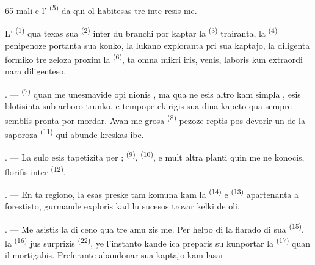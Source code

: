 \begin{VUpage}[67]{65}
\VUcontinue
mali e l' \textsuperscript{(5)} da qui ol habitesas tre inte\cc
resis me.

\VUblancAlinea
L' \textsuperscript{(1)} qua texas sua  \textsuperscript{(2)} inter du\nl
branchi por kaptar la  \textsuperscript{(3)} trairanta, la\nl
{} \textsuperscript{(4)} penipenoze portanta sua konko, la\nl
lukano exploranta pri sua kaptajo, la diligenta\nl
formiko tre zeloza proxim la  \textsuperscript{(6)}, ta\nl
omna mikri iris, venis, laboris kun extraordi\cc
nara diligenteso.

. ---  \textsuperscript{(7)} quan me unesmavide opi\cc
nionis , ma qua ne esis altro kam simpla\nl
{}, esis blotisinta sub arboro-trunko, e\nl
tempope ekirigis sua dina kapeto qua sempre\nl
semblis pronta por mordar. Avan me grosa\nl
{} \textsuperscript{(8)} pezoze reptis pos devorir un de la\nl
saporoza  \textsuperscript{(11)} qui abunde kreskas ibe.

. --- La sulo esis tapetizita per ;\nl
{} \textsuperscript{(9)},  \textsuperscript{(10)}, e mult altra planti\nl
quin me ne konocis, florifis inter \cc
{} \textsuperscript{(12)}.

. --- En ta regiono, la  esas preske\nl
tam komuna kam la  \textsuperscript{(14)} e  \textsuperscript{(13)}\nl
apartenanta a forestisto, gurmande exploris\nl
kad lu sucesos trovar kelki de oli.

\VUsaut{3.0mm}
\VUsaut{3.0mm}

. --- Me asistis la  di ceno qua tre amu\cc
zis me. Per helpo di la flarado di sua \cc
{} \textsuperscript{(15)}, la  \textsuperscript{(16)} jus surprizis \cc
{} \textsuperscript{(22)}, ye l'instanto kande ica preparis\nl
su kunportar la  \textsuperscript{(17)} quan il mortigabis.\nl
Preferante abandonar sua kaptajo kam lasar
\parplein
\end{VUpage}

